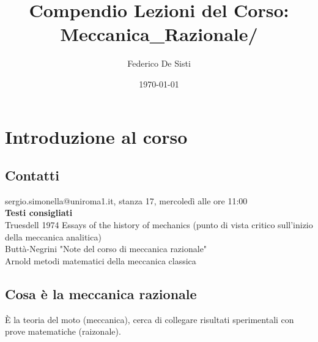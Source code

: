\documentclass{article}
\title{Compendio Lezioni del Corso: Meccanica_Razionale/}
\date{\today}
\author{Federico De Sisti}
\begin{document}
\maketitle
\maketitle
	\newpage
	\section{Introduzione al corso}
	\subsection{Contatti}
	sergio.simonella@uniroma1.it, stanza 17, mercoledì alle ore 11:00\\ 
	\textbf{Testi consigliati}\\
	Truesdell 1974 Essays of the history of mechanics (punto di vista critico sull'inizio della meccanica analitica)\\
	Buttà-Negrini "Note del corso di meccanica razionale"\\
	Arnold metodi matematici della meccanica classica
	\subsection{Cosa è la meccanica razionale}
	È la teoria del moto (meccanica), cerca di collegare risultati sperimentali con prove matematiche (raizonale).\\
\end{document}
